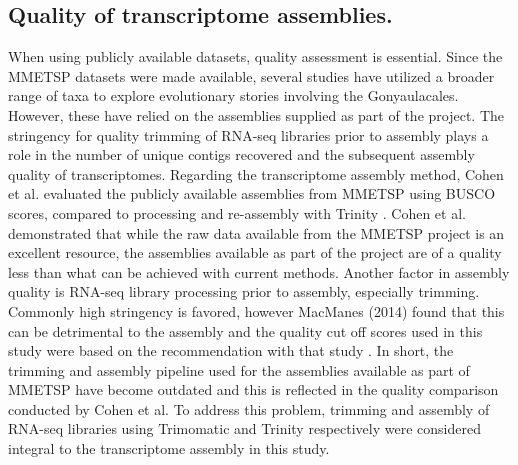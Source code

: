 \documentclass[12pt]{article}
\begin{document}
\subsection*{Quality of transcriptome assemblies.}
When using publicly available datasets, quality assessment is essential. 
Since the MMETSP datasets were made available, several studies have utilized a broader range of taxa to explore evolutionary stories involving the Gonyaulacales. 
However, these have relied on the assemblies supplied as part of the project. 
The stringency for quality trimming of RNA-seq libraries prior to assembly plays a role in the number of unique contigs recovered and the subsequent assembly quality of transcriptomes. 
Regarding the transcriptome assembly method, Cohen et al. evaluated the publicly available assemblies from MMETSP using BUSCO scores, compared to processing and re-assembly with Trinity \cite{cohen-reass}. 
Cohen et al. demonstrated that while the raw data available from the MMETSP project is an excellent resource, the assemblies available as part of the project are of a quality less than what can be achieved with current methods. 
Another factor in assembly quality is RNA-seq library processing prior to assembly, especially trimming. 
Commonly high stringency is favored, however MacManes (2014) found that this can be detrimental to the assembly and the quality cut off scores used in this study were based on the recommendation with that study \cite{macmanes2014optimal}.
In short, the trimming and assembly pipeline used for the assemblies available as part of MMETSP have become outdated and this is reflected in the quality comparison conducted by Cohen et al. 
To address this problem, trimming and assembly of RNA-seq libraries using Trimomatic and Trinity respectively were considered integral to the transcriptome assembly in this study.
\end{document}
